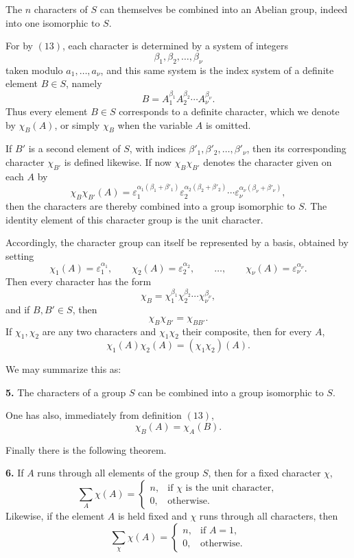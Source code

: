 \documentclass[11pt,a4paper]{book}
\begin{document}
The \(n\) characters of \(S\) can themselves be combined into an Abelian group, indeed into one isomorphic to \(S\).

For by \((13)\), each character is determined by a system of integers
\[
\beta_1,\beta_2,\dots,\beta_\nu
\]
taken modulo \(a_1,\dots,a_\nu\), and this same system is the index system of a definite element \(B\in S\), namely
\[
B=A_1^{\beta_1}A_2^{\beta_2}\cdots A_\nu^{\beta_\nu}.
\tag{14}
\]
Thus every element \(B\in S\) corresponds to a definite character, which we denote by \(\chi_B(A)\), or simply \(\chi_B\) when the variable \(A\) is omitted.

If \(B'\) is a second element of \(S\), with indices \(\beta'_1,\beta'_2,\dots,\beta'_\nu\), then its corresponding character \(\chi_{B'}\) is defined likewise. If now \(\chi_B\chi_{B'}\) denotes the character given on each \(A\) by
\[
\chi_B\chi_{B'}(A)
=
\varepsilon_1^{\alpha_1(\beta_1+\beta'_1)}
\varepsilon_2^{\alpha_2(\beta_2+\beta'_2)}
\cdots
\varepsilon_\nu^{\alpha_\nu(\beta_\nu+\beta'_\nu)},
\tag{15}
\]
then the characters are thereby combined into a group isomorphic to \(S\). The identity element of this character group is the unit character.

Accordingly, the character group can itself be represented by a basis, obtained by setting
\[
\chi_1(A)=\varepsilon_1^{\alpha_1},\qquad
\chi_2(A)=\varepsilon_2^{\alpha_2},\qquad
\dots,\qquad
\chi_\nu(A)=\varepsilon_\nu^{\alpha_\nu}.
\tag{16}
\]
Then every character has the form
\[
\chi_B = \chi_1^{\beta_1}\chi_2^{\beta_2}\cdots \chi_\nu^{\beta_\nu},
\tag{17}
\]
and if \(B,B'\in S\), then
\[
\chi_B\chi_{B'}=\chi_{BB'}.
\tag{18}
\]
If \(\chi_1,\chi_2\) are any two characters and \(\chi_1\chi_2\) their composite, then for every \(A\),
\[
\chi_1(A)\chi_2(A) = (\chi_1\chi_2)(A).
\tag{19}
\]

We may summarize this as:

\medskip
\noindent\textbf{5.} The characters of a group \(S\) can be combined into a group isomorphic to \(S\).

\medskip
One has also, immediately from definition \((13)\),
\[
\chi_B(A)=\chi_A(B).
\tag{20}
\]

Finally there is the following theorem.

\medskip
\noindent\textbf{6.} If \(A\) runs through all elements of the group \(S\), then for a fixed character \(\chi\),
\[
\sum_A \chi(A)=
\begin{cases}
n,& \text{if }\chi\text{ is the unit character},\\[4pt]
0,& \text{otherwise}.
\end{cases}
\tag{21}
\]
Likewise, if the element \(A\) is held fixed and \(\chi\) runs through all characters, then
\[
\sum_\chi \chi(A)=
\begin{cases}
n,& \text{if }A=1,\\[4pt]
0,& \text{otherwise}.
\end{cases}
\tag{22}
\]
\end{document}
